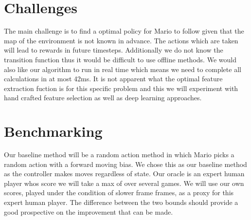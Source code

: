 \documentclass[12pt]{article}
\begin{document}
\section{Challenges}

The main challenge is to find a optimal policy for Mario to follow given that the map of the environment is not known in advance. The actions which are taken will lead to rewards in future timesteps. Additionally we do not know the transition function thus it would be difficult to use offline methods. We would also like our algorithm to run in real time which means we need to complete all calculations in at most 42ms. It is not apparent what the optimal feature extraction fuction is for this specific problem and this we will experiment with hand crafted feature selection as well as deep learning approaches.


\section{Benchmarking}

Our baseline method will be a random action method in which Mario picks a random action with a forward moving bias. We chose this as our baseline method as the controller makes moves regardless of state. Our oracle is an expert human player whos score we will take a max of over several games. We will use our own scores, played under the condition of slower frame frames, as a proxy for this expert human player. The difference between the two bounds should provide a good prospective on the improvement that can be made.
\end{document}
